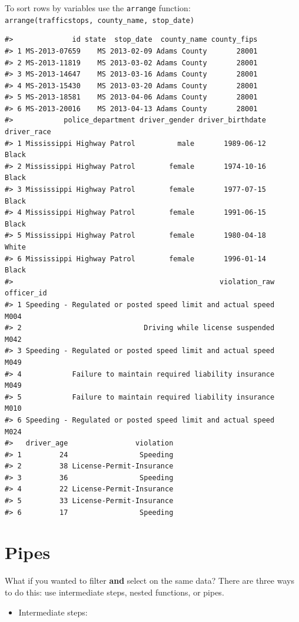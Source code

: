 \documentclass[]{book}
\providecommand{\tightlist}{%
  \setlength{\itemsep}{0pt}\setlength{\parskip}{0pt}}
\begin{document}
To sort rows by variables use the \texttt{arrange} function: \texttt{arrange(trafficstops,\ county\_name,\ stop\_date)}

\begin{verbatim}
#>              id state  stop_date  county_name county_fips
#> 1 MS-2013-07659    MS 2013-02-09 Adams County       28001
#> 2 MS-2013-11819    MS 2013-03-02 Adams County       28001
#> 3 MS-2013-14647    MS 2013-03-16 Adams County       28001
#> 4 MS-2013-15430    MS 2013-03-20 Adams County       28001
#> 5 MS-2013-18581    MS 2013-04-06 Adams County       28001
#> 6 MS-2013-20016    MS 2013-04-13 Adams County       28001
#>            police_department driver_gender driver_birthdate driver_race
#> 1 Mississippi Highway Patrol          male       1989-06-12       Black
#> 2 Mississippi Highway Patrol        female       1974-10-16       Black
#> 3 Mississippi Highway Patrol        female       1977-07-15       Black
#> 4 Mississippi Highway Patrol        female       1991-06-15       Black
#> 5 Mississippi Highway Patrol        female       1980-04-18       White
#> 6 Mississippi Highway Patrol        female       1996-01-14       Black
#>                                                 violation_raw officer_id
#> 1 Speeding - Regulated or posted speed limit and actual speed       M004
#> 2                             Driving while license suspended       M042
#> 3 Speeding - Regulated or posted speed limit and actual speed       M049
#> 4            Failure to maintain required liability insurance       M049
#> 5            Failure to maintain required liability insurance       M010
#> 6 Speeding - Regulated or posted speed limit and actual speed       M024
#>   driver_age                violation
#> 1         24                 Speeding
#> 2         38 License-Permit-Insurance
#> 3         36                 Speeding
#> 4         22 License-Permit-Insurance
#> 5         33 License-Permit-Insurance
#> 6         17                 Speeding
\end{verbatim}

\hypertarget{pipes}{%
\section{Pipes}\label{pipes}}

What if you wanted to filter \textbf{and} select on the same data? There are three ways to do this: use intermediate steps, nested functions, or pipes.

\begin{itemize}
\tightlist
\item
  Intermediate steps:
\end{itemize}
\end{document}
